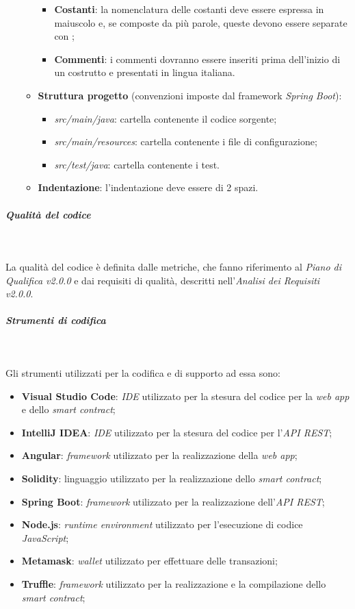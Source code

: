 \begin{itemize}
\begin{itemize}
\begin{itemize}
            \item \textbf{Costanti}: la nomenclatura delle costanti deve essere espressa in maiuscolo e, se composte da più parole, queste devono essere separate con \textit{\textunderscore};
            \item \textbf{Commenti}: i commenti dovranno essere inseriti prima dell’inizio di un  costrutto e presentati in lingua italiana.
        \end{itemize}
        \item \textbf{Struttura progetto} (convenzioni imposte dal framework \textit{Spring Boot}):
        \begin{itemize}
            \item \textit{src/main/java}: cartella contenente il codice sorgente;
            \item \textit{src/main/resources}: cartella contenente i file di configurazione;
            \item \textit{src/test/java}: cartella contenente i test.
        \end{itemize}
        \item \textbf{Indentazione}: l'indentazione deve essere di 2 spazi.
    \end{itemize}
\end{itemize}

\subparagraph{Qualità del codice}~

\noindent La qualità del codice è definita dalle metriche, che fanno riferimento al \textit{Piano di Qualifica v2.0.0} e dai requisiti di qualità, descritti nell'\textit{Analisi dei Requisiti v2.0.0}.

\subparagraph{Strumenti di codifica}~

\noindent Gli strumenti utilizzati per la codifica e di supporto ad essa sono:
\begin{itemize}
    \item \textbf{Visual Studio Code}: \textit{IDE} utilizzato per la stesura del codice per la \textit{web app} e dello \textit{smart contract};
    \item \textbf{IntelliJ IDEA}: \textit{IDE} utilizzato per la stesura del codice per l'\textit{API REST};
    \item \textbf{Angular}: \textit{framework} utilizzato per la realizzazione della \textit{web app};
    \item \textbf{Solidity}: linguaggio utilizzato per la realizzazione dello \textit{smart contract};
    \item \textbf{Spring Boot}: \textit{framework} utilizzato per la realizzazione dell'\textit{API REST};
    \item \textbf{Node.js}: \textit{runtime environment} utilizzato per l'esecuzione di codice \textit{JavaScript};
    \item \textbf{Metamask}: \textit{wallet} utilizzato per effettuare delle transazioni;
    \item \textbf{Truffle}: \textit{framework} utilizzato per la realizzazione e la compilazione dello \textit{smart contract};
\end{itemize}

